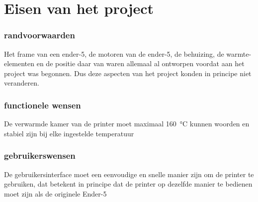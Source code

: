 \chapter{Eisen van het project}
\label{Eisen_van_het_project}

\subsection{randvoorwaarden}

Het frame van een ender-5, de motoren van de ender-5, de behuizing, de
warmte-elementen en de positie daar van waren allemaal al ontworpen voordat aan
het project was begonnen. Dus deze aspecten van het project konden in principe niet
veranderen.

\subsection{functionele wensen}

De verwarmde kamer van de printer moet maximaal \SI{160}{\celsius} kunnen
woorden en stabiel zijn bij elke ingestelde temperatuur

\subsection{gebruikerswensen}

De gebruikersinterface moet een eenvoudige en snelle manier zijn om de printer
te gebruiken, dat betekent in principe dat de printer op dezelfde manier te
bedienen moet zijn als de originele Ender-5

